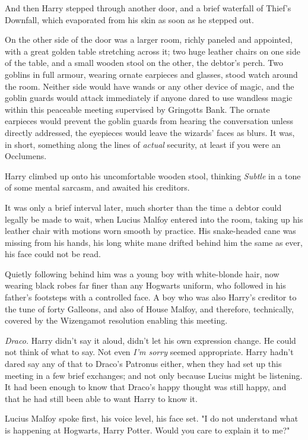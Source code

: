 And then Harry stepped through another door, and a brief waterfall of Thief's
Downfall, which evaporated from his skin as soon as he stepped out.

On the other side of the door was a larger room, richly paneled and appointed,
with a great golden table stretching across it; two huge leather chairs on one
side of the table, and a small wooden stool on the other, the debtor's perch.
Two goblins in full armour, wearing ornate earpieces and glasses, stood watch
around the room. Neither side would have wands or any other device of magic,
and the goblin guards would attack immediately if anyone dared to use wandless
magic within this peaceable meeting supervised by Gringotts Bank. The ornate
earpieces would prevent the goblin guards from hearing the conversation unless
directly addressed, the eyepieces would leave the wizards' faces as blurs. It
was, in short, something along the lines of \emph{actual} security, at least if
you were an Occlumens.

Harry climbed up onto his uncomfortable wooden stool, thinking \emph{Subtle} in
a tone of some mental sarcasm, and awaited his creditors.

It was only a brief interval later, much shorter than the time a debtor could
legally be made to wait, when Lucius Malfoy entered into the room, taking up
his leather chair with motions worn smooth by practice. His snake-headed cane
was missing from his hands, his long white mane drifted behind him the same as
ever, his face could not be read.

Quietly following behind him was a young boy with white-blonde hair, now
wearing black robes far finer than any Hogwarts uniform, who followed in his
father's footsteps with a controlled face. A boy who was also Harry's creditor
to the tune of forty Galleons, and also of House Malfoy, and therefore,
technically, covered by the Wizengamot resolution enabling this meeting.

\emph{Draco.} Harry didn't say it aloud, didn't let his own expression change.
He could not think of what to say. Not even \emph{I'm sorry} seemed
appropriate. Harry hadn't dared say any of that to Draco's Patronus either,
when they had set up this meeting in a few brief exchanges; and not only
because Lucius might be listening. It had been enough to know that Draco's
happy thought was still happy, and that he had still been able to want Harry to
know it.

Lucius Malfoy spoke first, his voice level, his face set. "I do not understand
what is happening at Hogwarts, Harry Potter. Would you care to explain it to
me?"

